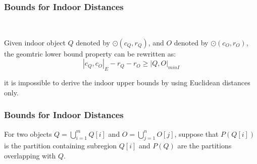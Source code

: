 
\begin{frame}
\frametitle{Bounds for Indoor Distances}

\\

\vspace{10pt}
\begin{lemma}
  Given indoor object $Q$ denoted by $\odot(c_Q, r_Q)$, and $O$ denoted by $\odot(c_O, r_O)$, the geomtric lower bound property can be rewritten as:
  \begin{equation}
    |c_Q, c_O|_E - r_Q - r_O \geq |Q, O|_{minI}
  \end{equation}
\end{lemma}

\vspace{10pt}
\textrm{it is impossible to derive the indoor upper bounds by using Euclidean distances only.}

\end{frame}


\begin{frame}
\frametitle{Bounds for Indoor Distances}


\vspace{30pt}

For two objects $Q = \bigcup_{i = 1}^{m} Q[i]$ and $O = \bigcup_{j = 1}^{n} O[j]$, suppose that $P(Q[i])$ is the partition containing subregion $Q[i]$ and $P(Q)$ are the partitions overlapping with $Q$.

\end{frame}



